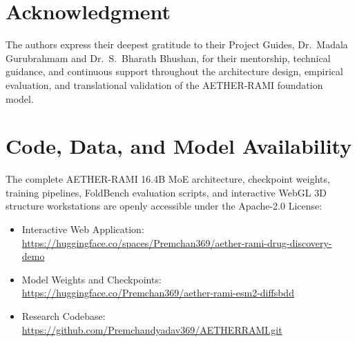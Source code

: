 \section*{Acknowledgment}
The authors express their deepest gratitude to their Project Guides, Dr.~Madala Gurubrahmam and Dr.~S.~Bharath Bhushan, for their mentorship, technical guidance, and continuous support throughout the architecture design, empirical evaluation, and translational validation of the AETHER-RAMI foundation model.

\section*{Code, Data, and Model Availability}
The complete AETHER-RAMI 16.4B MoE architecture, checkpoint weights, training pipelines, FoldBench evaluation scripts, and interactive WebGL 3D structure workstations are openly accessible under the Apache-2.0 License:
\begin{itemize}
    \item Interactive Web Application: \url{https://huggingface.co/spaces/Premchan369/aether-rami-drug-discovery-demo}
    \item Model Weights and Checkpoints: \url{https://huggingface.co/Premchan369/aether-rami-esm2-diffsbdd}
    \item Research Codebase: \url{https://github.com/Premchandyadav369/AETHERRAMI.git}
\end{itemize}
